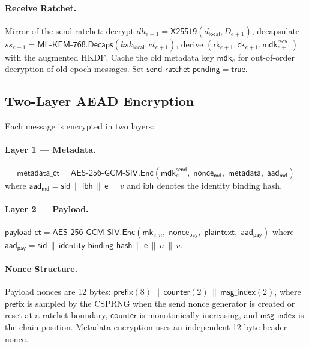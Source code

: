 \documentclass[11pt,a4paper]{article}
\theoremstyle{definition}
\theoremstyle{remark}
\newcommand{\AEAD}{\mathsf{AES\text{-}256\text{-}GCM\text{-}SIV}}
\renewcommand{\DH}{\mathsf{X25519}}
\newcommand{\KEM}{\mathsf{ML\text{-}KEM\text{-}768}}
\newcommand{\Decaps}{\mathsf{Decaps}}
\newcommand{\Enc}{\mathsf{Enc}}
\newcommand{\rk}{\mathsf{rk}}
\newcommand{\ck}{\mathsf{ck}}
\newcommand{\mk}{\mathsf{mk}}
\newcommand{\mdk}{\mathsf{mdk}}
\newcommand{\sid}{\mathsf{sid}}
\newcommand{\epoch}{\mathsf{e}}
\newcommand{\concat}{\,\|\,}
\begin{document}
\paragraph{Receive Ratchet.}
Mirror of the send ratchet: decrypt $\mathit{dh}_{e+1} = \DH(d_{\mathsf{local}}, D_{e+1})$,
decapsulate $\mathit{ss}_{e+1} = \KEM.\Decaps(\mathit{ksk}_{\mathsf{local}}, \mathit{ct}_{e+1})$,
derive $(\rk_{e+1}, \ck_{e+1}, \mdk_{e+1}^{\mathsf{recv}})$ with the
augmented HKDF.  Cache the old metadata key $\mdk_e$ for out-of-order
decryption of old-epoch messages.  Set $\mathsf{send\_ratchet\_pending} = \mathsf{true}$.

\subsection{Two-Layer AEAD Encryption}
\label{subsec:aead}

Each message is encrypted in two layers:

\paragraph{Layer 1 --- Metadata.}
\[
  \mathsf{metadata\_ct} = \AEAD.\Enc(\mdk_e^{\mathsf{send}},\;
  \mathsf{nonce}_{\mathsf{md}},\;
  \mathsf{metadata},\; \mathsf{aad}_{\mathsf{md}})
\]
where $\mathsf{aad}_{\mathsf{md}} = \sid \concat
\mathsf{ibh} \concat \epoch \concat v$
and $\mathsf{ibh}$ denotes the identity binding hash.

\paragraph{Layer 2 --- Payload.}
$\mathsf{payload\_ct} = \AEAD.\Enc(\mk_{e,n},\; \mathsf{nonce}_{\mathsf{pay}},\;
\mathsf{plaintext},\; \mathsf{aad}_{\mathsf{pay}})$
where $\mathsf{aad}_{\mathsf{pay}} = \sid \concat \mathsf{identity\_binding\_hash}
\concat \epoch \concat n \concat v$.

\paragraph{Nonce Structure.}
Payload nonces are 12 bytes:
$\mathsf{prefix}(8) \concat \mathsf{counter}(2) \concat
\mathsf{msg\_index}(2)$, where $\mathsf{prefix}$ is sampled by the CSPRNG
when the send nonce generator is created or reset at a ratchet boundary,
$\mathsf{counter}$ is monotonically increasing, and $\mathsf{msg\_index}$
is the chain position. Metadata encryption uses an independent 12-byte
header nonce.
\end{document}
